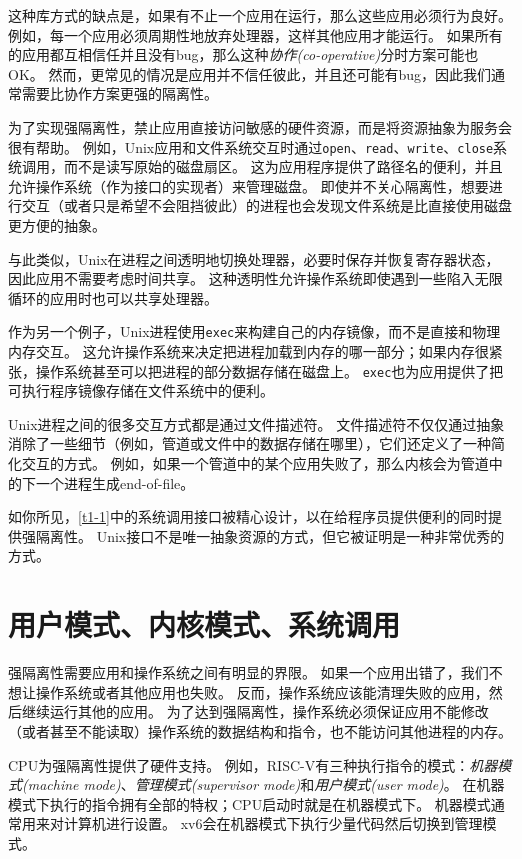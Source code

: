 这种库方式的缺点是，如果有不止一个应用在运行，那么这些应用必须行为良好。
例如，每一个应用必须周期性地放弃处理器，这样其他应用才能运行。
如果所有的应用都互相信任并且没有bug，那么这种\emph{协作(co-operative)}分时方案可能也OK。
然而，更常见的情况是应用并不信任彼此，并且还可能有bug，因此我们通常需要比协作方案更强的隔离性。

为了实现强隔离性，禁止应用直接访问敏感的硬件资源，而是将资源抽象为服务会很有帮助。
例如，Unix应用和文件系统交互时通过\texttt{open}、\texttt{read}、\texttt{write}、\texttt{close}系统调用，而不是读写原始的磁盘扇区。
这为应用程序提供了路径名的便利，并且允许操作系统（作为接口的实现者）来管理磁盘。
即使并不关心隔离性，想要进行交互（或者只是希望不会阻挡彼此）的进程也会发现文件系统是比直接使用磁盘更方便的抽象。

与此类似，Unix在进程之间透明地切换处理器，必要时保存并恢复寄存器状态，因此应用不需要考虑时间共享。
这种透明性允许操作系统即使遇到一些陷入无限循环的应用时也可以共享处理器。

作为另一个例子，Unix进程使用\texttt{exec}来构建自己的内存镜像，而不是直接和物理内存交互。
这允许操作系统来决定把进程加载到内存的哪一部分；如果内存很紧张，操作系统甚至可以把进程的部分数据存储在磁盘上。
\texttt{exec}也为应用提供了把可执行程序镜像存储在文件系统中的便利。

Unix进程之间的很多交互方式都是通过文件描述符。
文件描述符不仅仅通过抽象消除了一些细节（例如，管道或文件中的数据存储在哪里），它们还定义了一种简化交互的方式。
例如，如果一个管道中的某个应用失败了，那么内核会为管道中的下一个进程生成end-of-file。

如你所见，\autoref{t1-1}中的系统调用接口被精心设计，以在给程序员提供便利的同时提供强隔离性。
Unix接口不是唯一抽象资源的方式，但它被证明是一种非常优秀的方式。

\section{用户模式、内核模式、系统调用}
强隔离性需要应用和操作系统之间有明显的界限。
如果一个应用出错了，我们不想让操作系统或者其他应用也失败。
反而，操作系统应该能清理失败的应用，然后继续运行其他的应用。
为了达到强隔离性，操作系统必须保证应用不能修改（或者甚至不能读取）操作系统的数据结构和指令，也不能访问其他进程的内存。

CPU为强隔离性提供了硬件支持。
例如，RISC-V有三种执行指令的模式：\emph{机器模式(machine mode)}、\emph{管理模式(supervisor mode)}和\emph{用户模式(user mode)}。
在机器模式下执行的指令拥有全部的特权；CPU启动时就是在机器模式下。
机器模式通常用来对计算机进行设置。
xv6会在机器模式下执行少量代码然后切换到管理模式。

